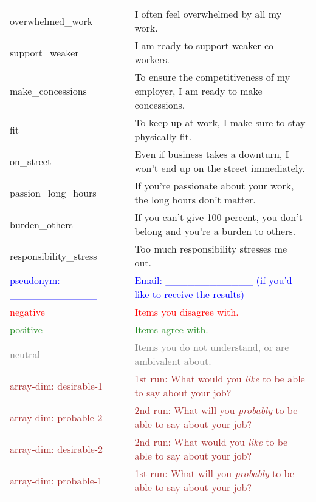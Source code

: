 \documentclass[a4paper,12pt]{article}\usepackage[]{graphicx}\usepackage[]{color}
\begin{document}
\begin{longtable}{H{72mm}m{0mm}m{75mm}}
  overwhelmed{\_{}}work & \rule[-27mm]{0mm}{54mm} & I often feel overwhelmed by all my work. \\
  support{\_{}}weaker & \rule[-27mm]{0mm}{54mm} & I am ready to support weaker co-workers. \\
  make{\_{}}concessions & \rule[-27mm]{0mm}{54mm} & To ensure the competitiveness of my employer, I am ready to make concessions. \\
  fit & \rule[-27mm]{0mm}{54mm} & To keep up at work, I make sure to stay physically fit. \\
  on{\_{}}street & \rule[-27mm]{0mm}{54mm} & Even if business takes a downturn, I won’t end up on the street immediately. \\
  passion{\_{}}long{\_{}}hours & \rule[-27mm]{0mm}{54mm} & If you’re passionate about your work, the long hours don’t matter. \\
  burden{\_{}}others & \rule[-27mm]{0mm}{54mm} & If you can’t give 100 percent, you don’t belong and you’re a burden to others. \\
  responsibility{\_{}}stress & \rule[-27mm]{0mm}{54mm} & Too much responsibility stresses me out. \\

  \textcolor{blue}{pseudonym: \_\_\_\_\_\_\_\_\_\_\_\_} & \rule[-27mm]{0mm}{54mm} & \textcolor{blue}{Email: \_\_\_\_\_\_\_\_\_\_\_\_ (if you'd like to receive the results)}\\

  \textcolor{red}{negative} & \rule[-27mm]{0mm}{54mm} & \textcolor{red}{Items you disagree with.} \\
  \textcolor{ForestGreen}{positive} & \rule[-27mm]{0mm}{54mm} & \textcolor{ForestGreen}{Items agree with.} \\
  \textcolor{Gray}{neutral} & \rule[-27mm]{0mm}{54mm} & \textcolor{Gray}{Items you do not understand, or are ambivalent about.} \\

  \textcolor{Brown}{array-dim: desirable-1} & \rule[-27mm]{0mm}{54mm} & \textcolor{brown}{1st run: What would you \emph{like} to be able to say about your job?} \\
  \textcolor{Brown}{array-dim: probable-2} & \rule[-27mm]{0mm}{54mm} & \textcolor{brown}{2nd run: What will you \emph{probably} to be able to say about your job?} \\

  \textcolor{Brown}{array-dim: desirable-2} & \rule[-27mm]{0mm}{54mm} & \textcolor{brown}{2nd run: What would you \emph{like} to be able to say about your job?} \\
  \textcolor{Brown}{array-dim: probable-1} & \rule[-27mm]{0mm}{54mm} & \textcolor{brown}{1st run: What will you \emph{probably} to be able to say about your job?} \\

\end{longtable}
\endgroup
\end{document}
